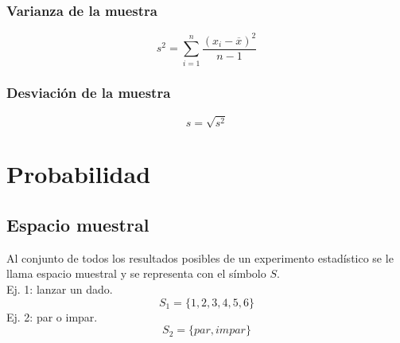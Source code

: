 \documentclass{report}
\begin{document}
      \subsection*{Varianza de la muestra}
        
        \begin{equation*}
          s^2=\sum_{i=1}^n\frac{(x_i-\overline{x})^2}{n-1}
        \end{equation*}

      \subsection*{Desviación de la muestra}

        \begin{equation*}
          s=\sqrt{s^2}
        \end{equation*}
  \chapter*{Probabilidad}
    
    \section*{Espacio muestral}
      Al conjunto de todos los resultados posibles de un experimento estadístico 
      se le llama espacio muestral y se representa con el símbolo $S$.\\
      \indent Ej. 1: lanzar un dado.
      \begin{equation*}
        S_1=\{1, 2, 3, 4, 5, 6\}
      \end{equation*}
      \indent Ej. 2: par o impar.
      \begin{equation*}
        S_2=\{par, impar\}
      \end{equation*}
\end{document}
